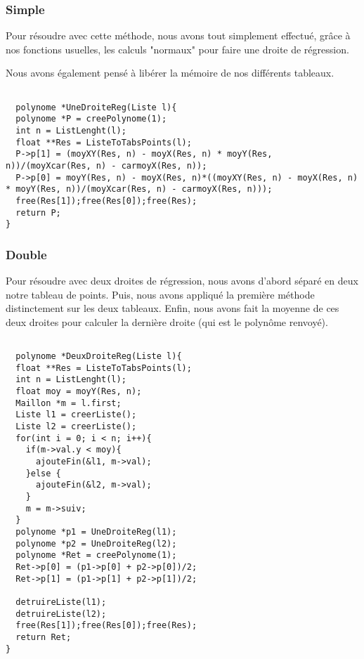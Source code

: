 \documentclass[letter]{article}
\begin{document}
\subsubsection{Simple}
\label{sec:org3469787}
Pour résoudre avec cette méthode, nous avons tout simplement effectué, grâce à nos fonctions usuelles, les calculs "normaux" pour faire une droite de régression.

Nous avons également pensé à libérer la mémoire de nos différents tableaux.

\begin{verbatim}

  polynome *UneDroiteReg(Liste l){
  polynome *P = creePolynome(1);
  int n = ListLenght(l);
  float **Res = ListeToTabsPoints(l);
  P->p[1] = (moyXY(Res, n) - moyX(Res, n) * moyY(Res, n))/(moyXcar(Res, n) - carmoyX(Res, n));
  P->p[0] = moyY(Res, n) - moyX(Res, n)*((moyXY(Res, n) - moyX(Res, n) * moyY(Res, n))/(moyXcar(Res, n) - carmoyX(Res, n)));
  free(Res[1]);free(Res[0]);free(Res);
  return P;
}

\end{verbatim}

\subsubsection{Double}
\label{sec:orgd7cf879}

Pour résoudre avec deux droites de régression, nous avons d'abord séparé en deux notre tableau de points. Puis, nous avons appliqué la première méthode distinctement sur les deux tableaux. Enfin, nous avons fait la moyenne de ces deux droites pour calculer la dernière droite (qui est le polynôme renvoyé).

\begin{verbatim}

  polynome *DeuxDroiteReg(Liste l){
  float **Res = ListeToTabsPoints(l);
  int n = ListLenght(l);
  float moy = moyY(Res, n);
  Maillon *m = l.first;
  Liste l1 = creerListe();
  Liste l2 = creerListe();
  for(int i = 0; i < n; i++){
    if(m->val.y < moy){
      ajouteFin(&l1, m->val);
    }else {
      ajouteFin(&l2, m->val);
    }
    m = m->suiv;
  }
  polynome *p1 = UneDroiteReg(l1);
  polynome *p2 = UneDroiteReg(l2);
  polynome *Ret = creePolynome(1);
  Ret->p[0] = (p1->p[0] + p2->p[0])/2;
  Ret->p[1] = (p1->p[1] + p2->p[1])/2;

  detruireListe(l1);
  detruireListe(l2);
  free(Res[1]);free(Res[0]);free(Res);
  return Ret;
}


\end{verbatim}
\end{document}

